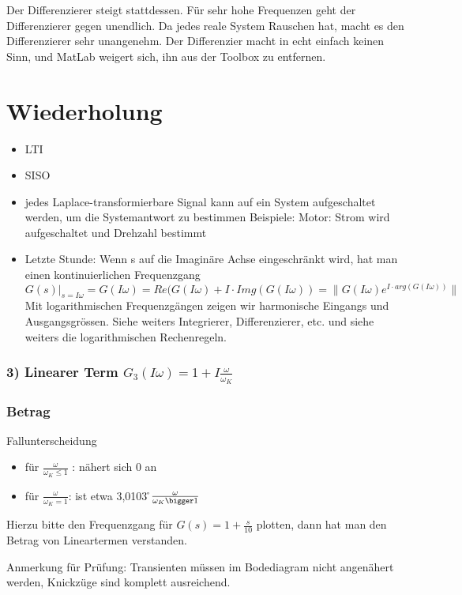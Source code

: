 \documentclass[a4paper]{article}
\begin{document}
Der Differenzierer steigt stattdessen. Für sehr hohe Frequenzen geht der Differenzierer gegen unendlich.
Da jedes reale System Rauschen hat, macht es den Differenzierer sehr unangenehm.
Der Differenzier macht in echt einfach keinen Sinn, und MatLab weigert sich, ihn aus der Toolbox zu entfernen.

\section*{Wiederholung}
\begin{itemize}
    \item LTI
    \item SISO
    \item jedes Laplace-transformierbare Signal kann auf ein System aufgeschaltet werden, um die Systemantwort zu bestimmen
        Beispiele: Motor: Strom wird aufgeschaltet und Drehzahl bestimmt
    \item Letzte Stunde: Wenn s auf die Imaginäre Achse eingeschränkt wird, hat man einen kontinuierlichen Frequenzgang
        $G(s)\vert_{s=I\omega}=G(I\omega)=Re(G(I\omega)+I\cdot Img(G(I\omega))=\|G(I\omega)e^{I\cdot arg(G(I\omega))}\|$ 
        Mit logarithmischen Frequenzgängen zeigen wir harmonische Eingangs und Ausgangsgrössen.\newline
        Siehe weiters Integrierer, Differenzierer, etc. und siehe weiters die logarithmischen Rechenregeln.
\end{itemize}

\subsubsection*{3) Linearer Term $G_{3}(I\omega)=1+I \frac{\omega}{\omega_{K}}$}
\subsubsection*{Betrag}
Fallunterscheidung
\begin{itemize}                    
    \item für $\frac{\omega}{\omega_{K} \le 1}$ : nähert sich $0$ an
    \item für $\frac{\omega}{\omega_{K} = 1}$: ist etwa 3,0103
    \r $\frac{\omega}{\omega_{K} \bigger 1}$
\end{itemize}
Hierzu bitte den Frequenzgang für $G(s)=1+\frac{s}{10}$ plotten, dann hat man den Betrag von Lineartermen verstanden.

Anmerkung für Prüfung: Transienten müssen im Bodediagram nicht angenähert werden, Knickzüge sind komplett ausreichend.
\end{document}
